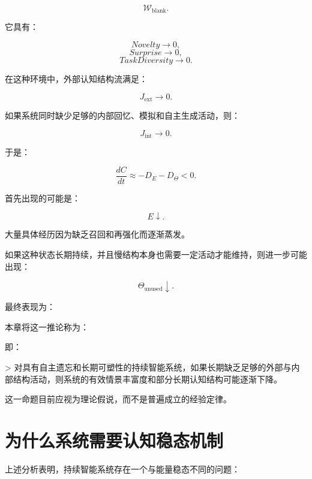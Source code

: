 \[
\mathcal W_{\mathrm{blank}}.
\]

它具有：

\[
Novelty\rightarrow0,
\]
\[
Surprise\rightarrow0,
\]
\[
TaskDiversity\rightarrow0.
\]

在这种环境中，外部认知结构流满足：

\[
J_{\mathrm{ext}}\rightarrow0.
\]

如果系统同时缺少足够的内部回忆、模拟和自主生成活动，则：

\[
J_{\mathrm{int}}\rightarrow0.
\]

于是：

\[
\frac{dC}{dt}
\approx
-
D_E-D_\Theta<0.
\]

首先出现的可能是：

\[
E\downarrow.
\]

大量具体经历因为缺乏召回和再强化而逐渐蒸发。

如果这种状态长期持续，并且慢结构本身也需要一定活动才能维持，则进一步可能出现：

\[
\Theta_{\mathrm{unused}}\downarrow.
\]

最终表现为：

\begin{statementbox}
\centering
{}
\end{statementbox}

本章将这一推论称为：

\begin{statementbox}
\centering
{}
\end{statementbox}

即：

> 对具有自主遗忘和长期可塑性的持续智能系统，如果长期缺乏足够的外部与内部结构活动，则系统的有效情景丰富度和部分长期认知结构可能逐渐下降。

这一命题目前应视为理论假说，而不是普遍成立的经验定律。

\section{为什么系统需要认知稳态机制}

上述分析表明，持续智能系统存在一个与能量稳态不同的问题：

\begin{statementbox}
\centering
{}
\end{statementbox}

